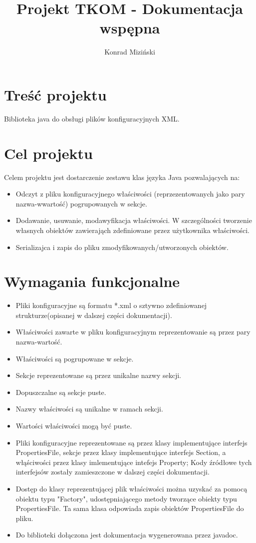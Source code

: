 \documentclass{article}
\author{Konrad Miziński}
\title{Projekt TKOM - Dokumentacja wspępna}
\begin{document}
\maketitle

\section{Treść projektu}
Biblioteka java do obsługi plików konfiguracyjnych XML.

\section{Cel projektu}
Celem projektu jest dostarczenie zestawu klas języka Java pozwalających na:
\begin{itemize}
	\item Odczyt z pliku konfiguracyjnego właściwości (reprzezentowanych jako pary nazwa-wwartość)
	pogrupowanych w sekcje.
	\item Dodawanie, usuwanie, modawyfikacja właściwości. W szczególności tworzenie własnych obiektów 
	zawierająch zdefiniowane przez użytkownika właściwości.
	\item Serializajca i zapis do pliku zmodyfikowanych/utworzonych obiektów.
\end{itemize}

\section{Wymagania funkcjonalne}
\begin{itemize}
	\item Pliki konfiguracyjne są formatu *.xml o sztywno zdefiniowanej strukturze(opisanej 
	w dalszej części dokumentacji).
	\item Właściwości zawarte w pliku konfiguracyjnym reprezentowanie są przez pary nazwa-wartość.
	\item Właściwości są pogrupowane w sekcje.
	\item Sekcje reprezentowane są przez unikalne nazwy sekcji.
	\item Dopuszczalne są sekcje puste.
	\item Nazwy właściwości są unikalne w ramach sekcji.
	\item Wartości właściwości mogą być puste.
	\item Pliki konfiguracyjne reprezentowane są przez klasy implementujące interfejs PropertiesFile,
	sekcje przez klasy implementujące interfejs Section,
	a włąściwości przez klasy imlementujące intefejs Property;
	Kody źródłowe tych interfejsów zostały zamieszczone w dalszej części dokumentacji.
	\item Dostęp do klasy reprezentującej plik właściwości można uzyskać za pomocą obiektu typu
	"Factory", udostępniającego metody tworzące obiekty typu PropertiesFile.
	Ta sama klasa odpowiada zapis obiektów PropertiesFile do pliku. 
	\item Do biblioteki dołączona jest dokumentacja wygenerowana przez javadoc.
\end{itemize}
\end{document}
